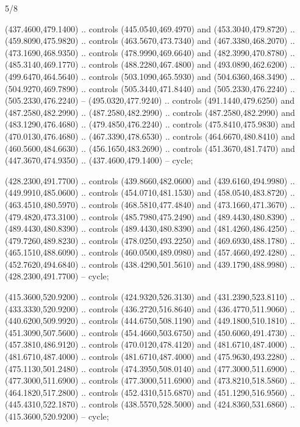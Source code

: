 \begin{flagdescription}{5/8}
\begin{scope}[shift={(m)}]
\begin{scope}[scale=\flagwidth/220,y=0.1mm, x=0.1mm, yscale=-1,shift={(-596,-360)}]
\begin{scope}[cm={{-1.0,0.0,0.0,1.0,(1193.9797,0.0)}}]
\begin{scope}[draw=black,line join=round,line cap=round,line width=0.381\lw]
\begin{scope}[line width=0.534\lw,fill=green]
 (437.4600,479.1400) .. controls (445.0540,469.4970) and
  (453.3040,479.8720) .. (459.8090,475.9820) .. controls (463.5670,473.7340) and
  (467.3380,468.2070) .. (473.1690,468.9350) .. controls (478.9990,469.6640) and
  (482.3990,470.8780) .. (485.3140,469.1770) .. controls (488.2280,467.4800) and
  (493.0890,462.6200) .. (499.6470,464.5640) .. controls (503.1090,465.5930) and
  (504.6360,468.3490) .. (504.9270,469.7890) .. controls (505.3440,471.8440) and
  (505.2330,476.2240) .. (505.2330,476.2240) -- (495.0320,477.9240) .. controls
  (491.1440,479.6250) and (487.2580,482.2990) .. (487.2580,482.2990) .. controls
  (487.2580,482.2990) and (483.1290,476.4680) .. (479.4850,476.2240) .. controls
  (475.8410,475.9830) and (470.0130,476.4680) .. (467.3390,478.6530) .. controls
  (464.6670,480.8410) and (460.5600,484.6630) .. (456.1650,483.2690) .. controls
  (451.3670,481.7470) and (447.3670,474.9350) .. (437.4600,479.1400) -- cycle;

 (428.2300,491.7700) .. controls (439.8660,482.0600) and
  (439.6160,494.9980) .. (449.9910,485.0600) .. controls (454.0710,481.1530) and
  (458.0540,483.8720) .. (463.4510,480.5970) .. controls (468.5810,477.4840) and
  (473.1660,471.3670) .. (479.4820,473.3100) .. controls (485.7980,475.2490) and
  (489.4430,480.8390) .. (489.4430,480.8390) .. controls (489.4430,480.8390) and
  (481.4260,486.4250) .. (479.7260,489.8230) .. controls (478.0250,493.2250) and
  (469.6930,488.1780) .. (465.1510,488.6090) .. controls (460.0500,489.0980) and
  (457.4660,492.4280) .. (452.7620,494.6840) .. controls (438.4290,501.5610) and
  (439.1790,488.9980) .. (428.2300,491.7700) -- cycle;

 (415.3600,520.9200) .. controls (424.9320,526.3130) and
  (431.2390,523.8110) .. (433.3330,520.9200) .. controls (436.2720,516.8640) and
  (436.4770,511.9060) .. (440.6200,509.9920) .. controls (444.6750,508.1190) and
  (449.1800,510.1810) .. (451.3090,507.5600) .. controls (454.4660,503.6750) and
  (450.6060,491.4730) .. (457.3810,486.9120) .. controls (470.0120,478.4120) and
  (481.6710,487.4000) .. (481.6710,487.4000) .. controls (481.6710,487.4000) and
  (475.9630,493.2280) .. (475.1130,501.2480) .. controls (474.3950,508.0140) and
  (477.3000,511.6900) .. (477.3000,511.6900) .. controls (477.3000,511.6900) and
  (473.8210,518.5860) .. (464.1820,517.2800) .. controls (452.4310,515.6870) and
  (451.1290,516.9560) .. (445.4310,522.1870) .. controls (438.5570,528.5000) and
  (424.8360,531.6860) .. (415.3600,520.9200) -- cycle;


\end{scope}
\end{scope}
\end{scope}
\end{scope}
\end{scope}
\end{flagdescription}
